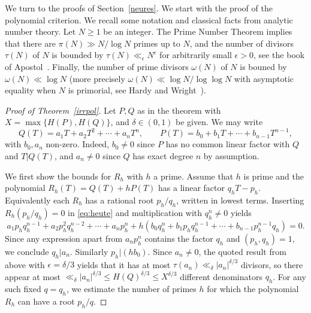 \documentclass[12pt]{amsart}
\theoremstyle{definition}
\begin{document}
We turn to the proofs of Section~\ref{neures}. We start with the
proof of the polynomial criterion. We recall some notation and classical facts from analytic number theory. Let $N\geq 1$ be an integer. 
The Prime Number Theorem 
implies that there are $\pi(N)\gg N/\log N$ primes up to $N$, and
the number of divisors $\tau(N)$ of $N$ is bounded by 
$\tau(N)\ll_{\epsilon} N^{\epsilon}$
for arbitrarily small $\epsilon>0$, see
the book of Apostol~\cite[page~296]{apostol}.
Finally, the number of prime divisors $\omega(N)$ of
$N$ is bouned by $\omega(N)\ll \log N$
(more precisely $\omega(N)\ll \log N/\log\log N$ with asymptotic equality
when $N$ is primorial, see Hardy and Wright~\cite{hw}).

\begin{proof}[Proof of Theorem~\ref{irrpol}]
Let $P,Q$ as in the theorem with $X= \max\{ H(P),H(Q)\}$, 
and $\delta\in(0,1)$ be given.
We may write
%
\begin{equation} \label{eq:heute}
Q(T)= a_{1}T+a_{2}T^{2}+\cdots+a_{n}T^{n}, \qquad 
P(T)=b_{0}+b_{1}T+\cdots +b_{n-1}T^{n-1},
\end{equation}
%
with $b_{0}, a_{n}$ non-zero.
Indeed, $b_{0}\neq 0$ since $P$ has no common linear factor 
with $Q$ and $T\vert Q(T)$, and $a_{n}\neq 0$ since $Q$ has 
exact degree $n$ by assumption.

We first show the bounds for $R_{h}$ with $h$ a prime.
Assume that $h$ is prime
and the polynomial $R_{h}(T)=Q(T)+hP(T)$  
has a linear factor $q_{h}T-p_{h}$. Equivalently each
$R_{h}$ has a rational root $p_{h}/q_{h}$, written 
in lowest terms.
Inserting $R_{h}(p_{h}/q_{h})=0$ in \eqref{eq:heute}
and multiplication with $q_{h}^{n}\neq 0$ yields
%
\begin{equation} \label{eq:det}
a_{1}p_{h}q_{h}^{n-1}+a_{2}p_{h}^{2}q_{h}^{n-2}+\cdots+a_{n}p_{h}^{n}
+h(b_{0}q_{h}^{n}+b_{1}p_{h}q_{h}^{n-1}+\cdots+b_{n-1}p_{h}^{n-1}q_{h})
=0.
\end{equation}
%
Since any expression apart from $a_{n}p_{h}^{n}$ contains the 
factor $q_{h}$
and $(p_{h},q_{h})=1$, we conclude $q_{h}\vert a_{n}$. 
Similarly $p_{h}\vert (hb_{0})$. 
Since $a_{n}\neq 0$, the quoted result from~\cite{apostol} above 
with $\epsilon=\delta/3$ yields that it has at most
$\tau(a_{n})\ll_{\delta} \vert a_{n}\vert^{\delta/3}$ divisors, so there appear at most 
$\ll_{\delta} \vert a_{n}\vert^{\delta/3}\leq H(Q)^{\delta/3}\leq X^{\delta/3}$ different denominators $q_{h}$. For any
such fixed $q=q_{h}$, we estimate the number of primes 
$h$ for which the polynomial $R_{h}$ can have a root $p_{h}/q$. 


\end{proof}
\end{document}
